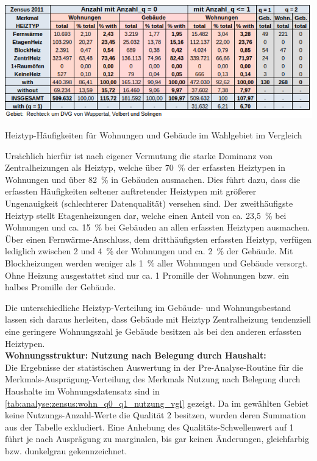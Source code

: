 			\begin{table}[h]
				\includegraphics[width=\linewidth]{./Medien/tables/Zensus_geb_wohn_analysis_q0_q1_heiztyp_vgl.png}
				\caption{Heiztyp-Häufigkeiten für Wohnungen und Gebäude im Wahlgebiet im Vergleich}
				\label{tab:analyse:zensus:geb_wohn_q0_q1_heiztyp_vgl}
			\end{table}
		
			Ursächlich hierfür ist nach eigener Vermutung die starke Dominanz von Zentralheizungen als Heiztyp, welche über 70~\% der erfassten Heiztypen in Wohnungen und über 82~\% in Gebäuden ausmachen. Dies führt dazu, dass die erfassten Häufigkeiten seltener auftretender Heiztypen mit größerer Ungenauigkeit (schlechterer Datenqualität) versehen sind. Der zweithäufigste Heiztyp stellt Etagenheizungen dar, welche einen Anteil von ca. 23,5~\% bei Wohnungen und ca. 15~\% bei Gebäuden an allen erfassten Heiztypen ausmachen. Über einen Fernwärme-Anschluss, dem dritthäufigsten erfassten Heiztyp, verfügen lediglich zwischen 2 und 4~\% der Wohnungen und ca. 2~\% der Gebäude. Mit Blockheizungen werden weniger als 1~\% aller Wohnungen und Gebäude versorgt. Ohne Heizung ausgestattet sind nur ca. 1 Promille der Wohnungen bzw. ein halbes Promille der Gebäude. %
			
			Die unterschiedliche Heiztyp-Verteilung im Gebäude- und Wohnungsbestand lassen sich daraus herleiten, dass Gebäude mit Heiztyp Zentralheizung tendenziell eine geringere Wohnungszahl je Gebäude besitzen als bei den anderen erfassten Heiztypen.\\

			\textbf{Wohnungsstruktur: Nutzung nach Belegung durch Haushalt:}\\
			Die Ergebnisse der statistischen Auswertung in der Pre-Analyse-Routine für die Merkmals-Ausprägung-Verteilung des Merkmals Nutzung nach Belegung durch Haushalte im Wohnungsdatensatz sind in \autoref{tab:analyse:zensus:wohn_q0_q1_nutzung_vgl} gezeigt. Da im gewählten Gebiet keine Nutzungs-Anzahl-Werte die Qualität 2 besitzen, wurden deren Summation aus der Tabelle exkludiert. Eine Anhebung des Qualitäts-Schwellenwert auf 1 führt je nach Ausprägung zu marginalen, bis gar keinen Änderungen, gleichfarbig bzw. dunkelgrau gekennzeichnet.
			
